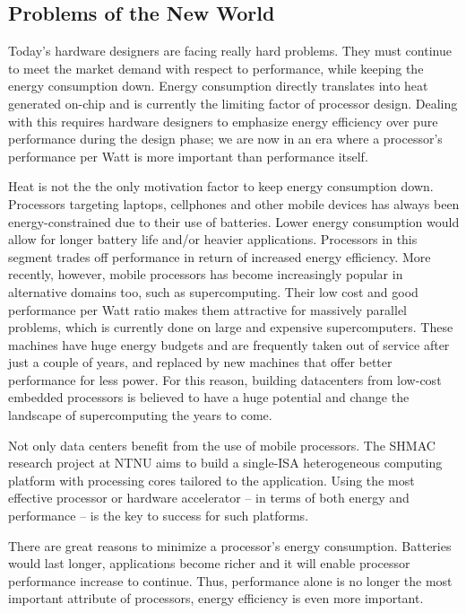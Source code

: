\subsection{Problems of the New World}

Today's hardware designers are facing really hard problems. They must continue
to meet the market demand with respect to performance, while keeping the energy
consumption down. Energy consumption directly translates into heat generated
on-chip and is currently the limiting factor of processor design. Dealing with
this requires hardware designers to emphasize energy efficiency over pure
performance during the design phase; we are now in an era where a processor's
performance per Watt is more important than performance itself.

Heat is not the the only motivation factor to keep energy consumption down.
Processors targeting laptops, cellphones and other mobile devices has always
been energy-constrained due to their use of batteries. Lower energy consumption
would allow for longer battery life and/or heavier applications. Processors in
this segment trades off performance in return of increased energy efficiency.
More recently, however, mobile processors has become increasingly popular in
alternative domains too, such as supercomputing. Their low cost and good
performance per Watt ratio makes them attractive for massively parallel
problems, which is currently done on large and expensive supercomputers. These
machines have huge energy budgets and are frequently taken out of service after
just a couple of years, and replaced by new machines that offer better
performance for less power. For this reason, building datacenters from low-cost
embedded processors is believed to have a huge potential and change the
landscape of supercomputing the years to come.

Not only data centers benefit from the use of mobile processors. The SHMAC
research project at NTNU aims to build a single-ISA heterogeneous computing
platform with processing cores tailored to the application. Using the most
effective processor or hardware accelerator -- in terms of both energy
and performance -- is the key to success for such platforms.

There are great reasons to minimize a processor's energy consumption. Batteries
would last longer, applications become richer and it will enable processor
performance increase to continue. Thus, performance alone is no longer the most
important attribute of processors, energy efficiency is even more important.


